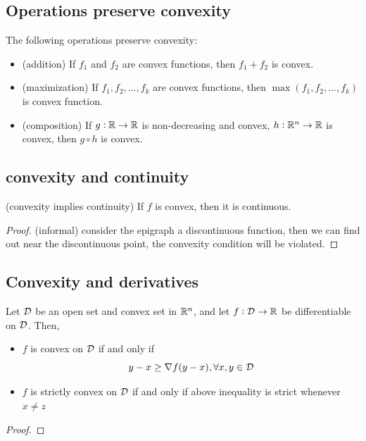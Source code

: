 \begin{refsection}
\begin{example}
\begin{itemize}
\end{itemize}
\end{example}



\subsection{Operations preserve convexity}
\begin{lemma}\cite[12]{bertsekas2009convex}
	The following operations preserve convexity:
	
	\begin{itemize}
		\item (addition) If $f_1$ and $f_2$ are convex functions, then $f_1+f_2$ is convex. 
		\item (maximization) If $f_1,f_2,...,f_k$ are convex functions, then $\max(f_1,f_2,...,f_k)$ is convex function.
		\item (composition) If $g:\mathbb{R}\rightarrow \mathbb{R}$ is non-decreasing and convex, $h:\mathbb{R}^n\rightarrow \mathbb{R}$ is convex, then $g\circ h$ is convex. 
	\end{itemize}
\end{lemma}



\subsection{convexity and continuity}
\begin{theorem}
	(convexity implies continuity) If $f$ is convex, then it is continuous.
\end{theorem}
\begin{proof}
	(informal) consider the epigraph a discontinuous function, then we can find out near the discontinuous point, the convexity condition will be violated. 
\end{proof}


\subsection{Convexity and derivatives}
\begin{theorem}\label{ch:convex-analysis:th:firstderivativeaslinearunderEstimaor}\cite[14]{bertsekas2009convex}
Let $\mathcal{D}$ be an open set and convex set in $\mathbb{R}^n$, and let $f:\mathcal{D} \to \mathbb{R}$ be differentiable on $\mathcal{D}$. Then, 
	\begin{itemize}
	    \item $f$ is convex on $\mathcal{D}$ if and only if $$y - x \geq \nabla f (y-x),\forall x,y \in \mathcal{D} $$ 
	    \item $f$ is strictly convex on $\mathcal{D}$ if and only if above inequality is strict whenever $x\neq z$
	\end{itemize}
\end{theorem}
\begin{proof}
	

\end{proof}
\end{refsection}
